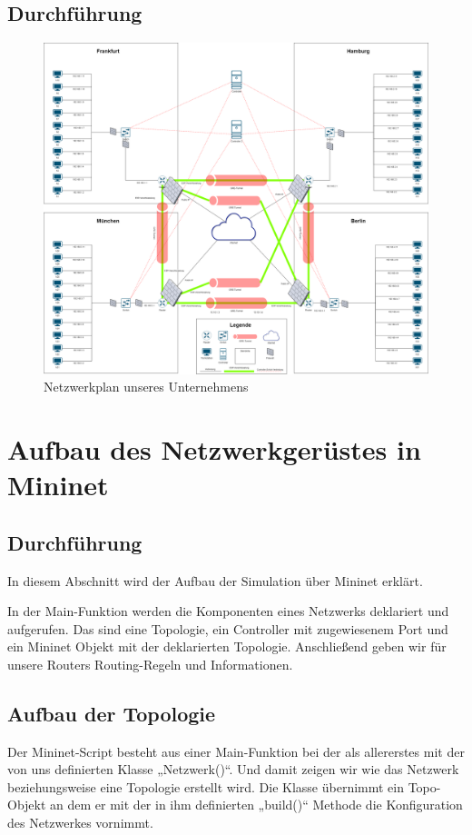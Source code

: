\documentclass[fontsize=12pt,paper=a4,open=any,parskip=half,
  twoside=false,toc=listof,toc=bibliography,fleqn,leqno,
  captions=nooneline,captions=tableabove,british]{scrbook}
\begin{document}
\subsection{Durchführung}


\begin{figure}[htbp]
 \centering
 \includegraphics[width=1.0\textwidth]{Bilder/netzwerkplan}
 \captionsetup{justification=centering,margin=2cm}
 \caption{Netzwerkplan unseres Unternehmens}
 \label{networkplan}
\end{figure}

\section{Aufbau des Netzwerkgerüstes in Mininet}
\subsection{Durchführung}
In diesem Abschnitt wird der Aufbau der Simulation über Mininet erklärt.
 
In der Main-Funktion werden die Komponenten eines Netzwerks deklariert und aufgerufen. Das sind eine Topologie, ein Controller mit zugewiesenem Port und ein Mininet Objekt mit der deklarierten Topologie. Anschließend geben wir für unsere Routers Routing-Regeln und Informationen.

\subsection{Aufbau der Topologie}
Der Mininet-Script besteht aus einer Main-Funktion bei der als allererstes mit der von uns definierten Klasse „Netzwerk()“. Und damit zeigen wir wie das Netzwerk beziehungsweise eine Topologie erstellt wird. Die Klasse übernimmt ein Topo-Objekt an dem er mit der in ihm definierten „build()“ Methode die Konfiguration des Netzwerkes vornimmt. 
 
\end{document}
